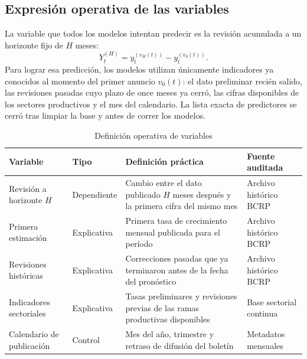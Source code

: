 \subsection{Expresión operativa de las variables}

La variable que todos los modelos intentan predecir es la revisión acumulada a un horizonte fijo de \(H\) meses:
\[
Y_t^{(H)}=y_t^{(v_H(t))}-y_t^{(v_0(t))}.
\]
Para lograr esa predicción, los modelos utilizan únicamente indicadores ya conocidos al momento del primer anuncio \(v_0(t)\): el dato preliminar recién salido, las revisiones pasadas cuyo plazo de once meses ya cerró, las cifras disponibles de los sectores productivos y el mes del calendario. La lista exacta de predictores se cerró tras limpiar la base y antes de correr los modelos.

\begin{table}[htbp]
	\centering
	\caption{Definición operativa de variables}
	\label{tab:variables}
	\footnotesize
	\renewcommand{\arraystretch}{1.15}
	\begin{tabular}{@{}>{\raggedright\arraybackslash}p{3.1cm}>{\raggedright\arraybackslash}p{2.3cm}>{\raggedright\arraybackslash}p{6.1cm}>{\raggedright\arraybackslash}p{2.5cm}@{}}
		\toprule
		Variable & Tipo & Definición práctica & Fuente auditada\\
		\midrule
		Revisión a horizonte \(H\) & Dependiente & Cambio entre el dato publicado \(H\) meses después y la primera cifra del mismo mes & Archivo histórico BCRP\\
		Primera estimación & Explicativa & Primera tasa de crecimiento mensual publicada para el período & Archivo histórico BCRP\\
		Revisiones históricas & Explicativa & Correcciones pasadas que ya terminaron antes de la fecha del pronóstico & Archivo histórico BCRP\\
		Indicadores sectoriales & Explicativa & Tasas preliminares y revisiones previas de las ramas productivas disponibles & Base sectorial continua\\
		Calendario de publicación & Control & Mes del año, trimestre y retraso de difusión del boletín & Metadatos mensuales\\
		\bottomrule
	\end{tabular}
\end{table}
